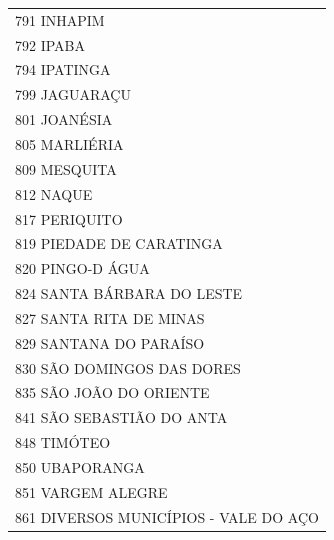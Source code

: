 \documentclass{article}
\begin{document}
\begin{longtable}[c]{m{18cm}}
\multicolumn{1}{l}{ \hspace{2em} 791 INHAPIM } \\
\multicolumn{1}{l}{ \hspace{2em} 792 IPABA } \\
\multicolumn{1}{l}{ \hspace{2em} 794 IPATINGA } \\
\multicolumn{1}{l}{ \hspace{2em} 799 JAGUARAÇU } \\
\multicolumn{1}{l}{ \hspace{2em} 801 JOANÉSIA } \\
\multicolumn{1}{l}{ \hspace{2em} 805 MARLIÉRIA } \\
\multicolumn{1}{l}{ \hspace{2em} 809 MESQUITA } \\
\multicolumn{1}{l}{ \hspace{2em} 812 NAQUE } \\
\multicolumn{1}{l}{ \hspace{2em} 817 PERIQUITO } \\
\multicolumn{1}{l}{ \hspace{2em} 819 PIEDADE DE CARATINGA } \\
\multicolumn{1}{l}{ \hspace{2em} 820 PINGO-D ÁGUA } \\
\multicolumn{1}{l}{ \hspace{2em} 824 SANTA BÁRBARA DO LESTE } \\
\multicolumn{1}{l}{ \hspace{2em} 827 SANTA RITA DE MINAS } \\
\multicolumn{1}{l}{ \hspace{2em} 829 SANTANA DO PARAÍSO } \\
\multicolumn{1}{l}{ \hspace{2em} 830 SÃO DOMINGOS DAS DORES } \\
\multicolumn{1}{l}{ \hspace{2em} 835 SÃO JOÃO DO ORIENTE } \\
\multicolumn{1}{l}{ \hspace{2em} 841 SÃO SEBASTIÃO DO ANTA } \\
\multicolumn{1}{l}{ \hspace{2em} 848 TIMÓTEO } \\
\multicolumn{1}{l}{ \hspace{2em} 850 UBAPORANGA } \\
\multicolumn{1}{l}{ \hspace{2em} 851 VARGEM ALEGRE } \\
\multicolumn{1}{l}{ \hspace{2em} 861 DIVERSOS MUNICÍPIOS - VALE DO AÇO } \\
\end{longtable}
\end{document}
